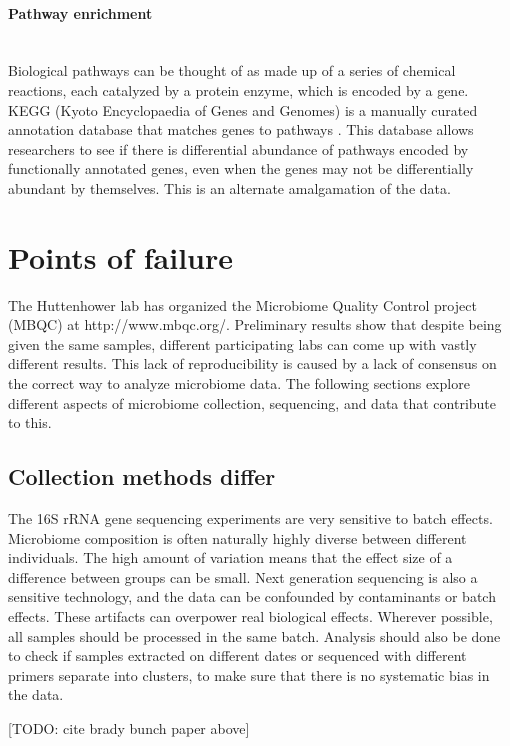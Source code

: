 \FloatBarrier

\paragraph{Pathway enrichment}\mbox{}\\
Biological pathways can be thought of as made up of a series of chemical reactions, each catalyzed by a protein enzyme, which is encoded by a gene. KEGG (Kyoto Encyclopaedia of Genes and Genomes) is a manually curated annotation database that matches genes to pathways \cite{kanehisa2000kegg}. This database allows researchers to see if there is differential abundance of pathways encoded by functionally annotated genes, even when the genes may not be differentially abundant by themselves. This is an alternate amalgamation of the data.

\section{Points of failure}
The Huttenhower lab has organized the Microbiome Quality Control project (MBQC) at http://www.mbqc.org/. Preliminary results show that despite being given the same samples, different participating labs can come up with vastly different results. This lack of reproducibility is caused by a lack of consensus on the correct way to analyze microbiome data. The following sections explore different aspects of microbiome collection, sequencing, and data that contribute to this.

\subsection{Collection methods differ}
The 16S rRNA gene sequencing experiments are very sensitive to batch effects. Microbiome composition is often naturally highly diverse between different individuals. The high amount of variation means that the effect size of a difference between groups can be small. Next generation sequencing is also a sensitive technology, and the data can be confounded by contaminants or batch effects. These artifacts can overpower real biological effects. Wherever possible, all samples should be processed in the same batch. Analysis should also be done to check if samples extracted on different dates or sequenced with different primers separate into clusters, to make sure that there is no systematic bias in the data.

[TODO: cite brady bunch paper above]

